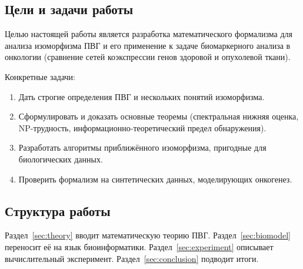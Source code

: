 \subsection{Цели и задачи работы}

Целью настоящей работы является разработка математического формализма
для анализа изоморфизма ПВГ и его применение к задаче биомаркерного анализа
в онкологии (сравнение сетей коэкспрессии генов здоровой и опухолевой ткани).

Конкретные задачи:
\begin{enumerate}
    \item Дать строгие определения ПВГ и нескольких понятий изоморфизма.
    \item Сформулировать и доказать основные теоремы (спектральная нижняя оценка,
          NP-трудность, информационно-теоретический предел обнаружения).
    \item Разработать алгоритмы приближённого изоморфизма, пригодные для биологических данных.
    \item Проверить формализм на синтетических данных, моделирующих онкогенез.
\end{enumerate}

\subsection{Структура работы}

Раздел~\ref{sec:theory} вводит математическую теорию ПВГ.
Раздел~\ref{sec:biomodel} переносит её на язык биоинформатики.
Раздел~\ref{sec:experiment} описывает вычислительный эксперимент.
Раздел~\ref{sec:conclusion} подводит итоги.
